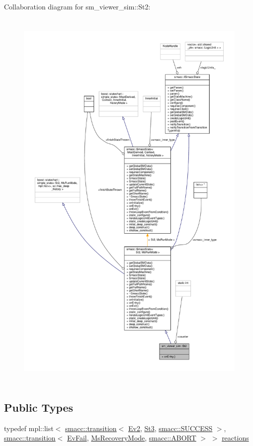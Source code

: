Collaboration diagram for sm\+\_\+viewer\+\_\+sim\+:\+:St2\+:
\nopagebreak
\begin{figure}[H]
\begin{center}
\leavevmode
\includegraphics[height=550pt]{structsm__viewer__sim_1_1St2__coll__graph}
\end{center}
\end{figure}
\subsection*{Public Types}
\begin{DoxyCompactItemize}
\item 
typedef mpl\+::list$<$ \hyperlink{classsmacc_1_1transition}{smacc\+::transition}$<$ \hyperlink{structsm__viewer__sim_1_1Ev2}{Ev2}, \hyperlink{structsm__viewer__sim_1_1St3}{St3}, \hyperlink{structsmacc_1_1SUCCESS}{smacc\+::\+S\+U\+C\+C\+E\+SS} $>$, \hyperlink{classsmacc_1_1transition}{smacc\+::transition}$<$ \hyperlink{structsm__viewer__sim_1_1EvFail}{Ev\+Fail}, \hyperlink{structsm__viewer__sim_1_1MsRecoveryMode}{Ms\+Recovery\+Mode}, \hyperlink{structsmacc_1_1ABORT}{smacc\+::\+A\+B\+O\+RT} $>$ $>$ \hyperlink{structsm__viewer__sim_1_1St2_adef5108438c9d8891229f9d247bd5995}{reactions}
\end{DoxyCompactItemize}
